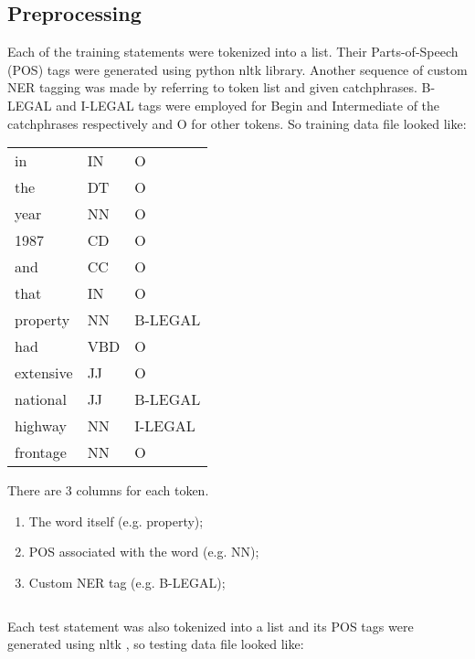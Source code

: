 \subsection{Preprocessing}
Each of the training statements were tokenized into a list. Their Parts-of-Speech (POS) tags were generated using python nltk \cite{nltk} library. Another sequence of custom NER tagging was made by referring to token list and given catchphrases. B-LEGAL and I-LEGAL tags were employed for Begin and Intermediate of the catchphrases respectively and  O for other tokens. 
So training data file looked like:
\begin{center}
\begin{tabular}[h]{ l  l  l}
in                 &  IN     &       O \\
the              &  DT     &       O\\
year            &  NN    &       O\\
1987 		&	CD 	&	O\\
and 		&	CC 	&	O\\
that 	     &      IN 	&		O\\
property 	&	NN 	 &    B-LEGAL\\
had 		&	VBD 	&	O\\
extensive& 	JJ 		&	O\\
national 	&	JJ 	      &     B-LEGAL\\
highway 	&     NN 	 &    I-LEGAL\\
frontage 	&	NN 	&	O\\
\end{tabular}
\label{tab:training}
\end{center}
There are 3 columns for each token.
\begin{enumerate}
	\item The word itself (e.g. property);
	\item POS associated with the word (e.g. NN);
	\item Custom NER tag  (e.g. B-LEGAL);
\end{enumerate}

\begin{lstlisting}

\end{lstlisting}
Each test statement was also tokenized into a list and its POS tags were generated using nltk \cite{nltk}, so testing data file looked like:

